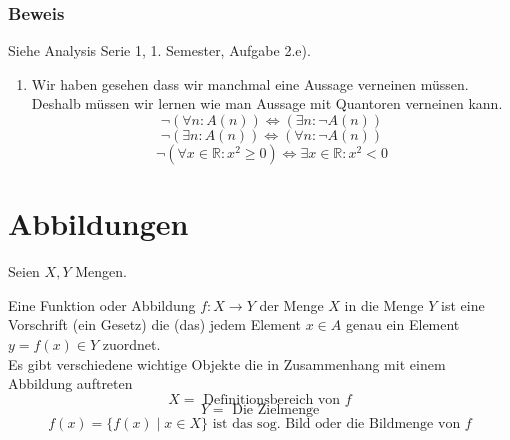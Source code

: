 \subsubsection*{Beweis}
Siehe Analysis Serie 1, 1. Semester, Aufgabe 2.e).
\begin{enumerate}[($\ast$)]
\item Wir haben gesehen dass wir manchmal eine Aussage verneinen müssen. Deshalb müssen wir lernen wie man Aussage mit Quantoren verneinen kann.
\[\neg\left(\forall n:A(n)\right)\Leftrightarrow\left(\exists n:\neg A(n)\right)\]
\[\neg\left(\exists n:A(n)\right)\Leftrightarrow\left(\forall n:\neg A(n)\right)\]
\[\neg\left(\forall x\in \mathbb{R}:x^2\geq 0\right)\Leftrightarrow\exists x\in\mathbb{R}:x^2<0\]
\end{enumerate}
\section{Abbildungen}
Seien $X,Y$ Mengen. 

\begin{definition}{1.9}
Eine Funktion oder Abbildung $f:X\rightarrow Y$ der Menge $X$ in die Menge $Y$ ist eine Vorschrift (ein Gesetz) die (das) jedem Element $x\in A$ genau ein Element $y=f(x)\in Y$ zuordnet. \\

Es gibt verschiedene wichtige Objekte die in Zusammenhang mit einem Abbildung auftreten 
\[X= \text{ Definitionsbereich von } f\]
\[Y= \text{ Die Zielmenge}\]
\[f(x)=\{f(x)\mid x\in X\}\text{ ist das sog. Bild oder die Bildmenge von }f\]
\end{definition}

